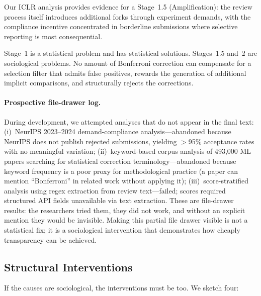 \documentclass{article}
\begin{document}
Our ICLR analysis provides evidence for a Stage~1.5 (Amplification): the review process itself introduces additional forks through experiment demands, with the compliance incentive concentrated in borderline submissions where selective reporting is most consequential.

Stage~1 is a statistical problem and has statistical solutions. Stages~1.5 and~2 are sociological problems. No amount of Bonferroni correction can compensate for a selection filter that admits false positives, rewards the generation of additional implicit comparisons, and structurally rejects the corrections.

\paragraph{Prospective file-drawer log.} During development, we attempted analyses that do not appear in the final text: (i)~NeurIPS 2023--2024 demand-compliance analysis---abandoned because NeurIPS does not publish rejected submissions, yielding $>$95\% acceptance rates with no meaningful variation; (ii)~keyword-based corpus analysis of 493,000 ML papers searching for statistical correction terminology---abandoned because keyword frequency is a poor proxy for methodological practice (a paper can mention ``Bonferroni'' in related work without applying it); (iii)~score-stratified analysis using regex extraction from review text---failed; scores required structured API fields unavailable via text extraction. These are file-drawer results: the researchers tried them, they did not work, and without an explicit mention they would be invisible. Making this partial file drawer visible is not a statistical fix; it is a sociological intervention that demonstrates how cheaply transparency can be achieved.

\subsection{Structural Interventions}

If the causes are sociological, the interventions must be too. We sketch four:
\end{document}
